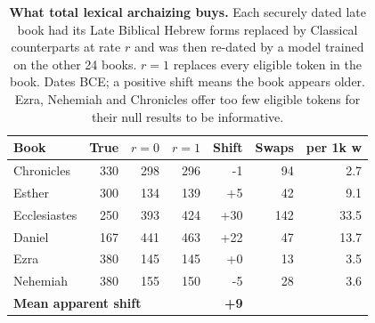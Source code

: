 \begin{table}[!ht]
\centering
\footnotesize
\caption{\textbf{What total lexical archaizing buys.}  Each securely dated late book had its Late Biblical Hebrew forms replaced by Classical counterparts at rate $r$ and was then re-dated by a model trained on the other 24 books. $r=1$ replaces every eligible token in the book.  Dates BCE; a positive shift means the book appears older.  Ezra, Nehemiah and Chronicles offer too few eligible tokens for their null results to be informative.}
\label{tab:archaize}
\begin{tabular}{lrrrrrr}
\toprule
\textbf{Book} & \textbf{True} & \textbf{$r=0$} & \textbf{$r=1$} & \textbf{Shift} & \textbf{Swaps} & \textbf{per 1k w} \\
\midrule
Chronicles & 330 & 298 & 296 & -1 & 94 & 2.7 \\
Esther & 300 & 134 & 139 & +5 & 42 & 9.1 \\
Ecclesiastes & 250 & 393 & 424 & +30 & 142 & 33.5 \\
Daniel & 167 & 441 & 463 & +22 & 47 & 13.7 \\
Ezra & 380 & 145 & 145 & +0 & 13 & 3.5 \\
Nehemiah & 380 & 155 & 150 & -5 & 28 & 3.6 \\
\midrule
\multicolumn{4}{l}{\textbf{Mean apparent shift}} & \textbf{+9} & & \\
\bottomrule
\end{tabular}
\end{table}
